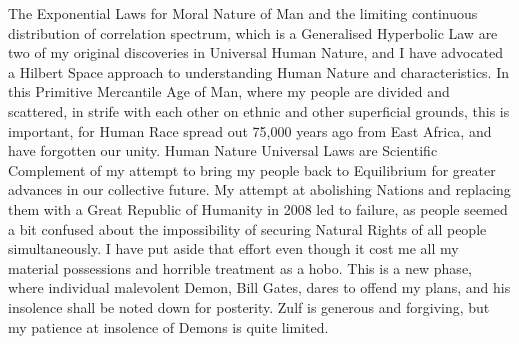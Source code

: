 \documentclass{amsart}
\begin{document}
The Exponential Laws for Moral Nature of Man and the limiting continuous distribution of correlation spectrum, which is a Generalised Hyperbolic Law are two of my original discoveries in Universal Human Nature, and I have advocated a Hilbert Space approach to understanding Human Nature and characteristics.  In this Primitive Mercantile Age of Man, where my people are divided and scattered, in strife with each other on ethnic and other superficial grounds, this is important, for Human Race spread out 75,000 years ago from East Africa, and have forgotten our unity.  Human Nature Universal Laws are Scientific Complement of my attempt to bring my people back to Equilibrium for greater advances in our collective future.  My attempt at abolishing Nations and replacing them with a Great Republic of Humanity in 2008 led to failure, as people seemed a bit confused about the impossibility of securing Natural Rights of all people simultaneously.  I have put aside that effort even though it cost me all my material possessions and horrible treatment as a hobo.  This is a new phase, where individual malevolent Demon, Bill Gates, dares to offend my plans, and his insolence shall be noted down for posterity.  Zulf is generous and forgiving, but my patience at insolence of Demons is quite limited.
\end{document}
